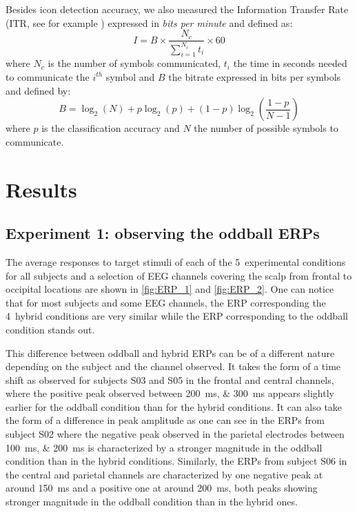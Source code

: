 \documentclass[10pt]{article}
\begin{document}
        Besides icon detection accuracy, we also measured the Information Transfer Rate (ITR, see for example \cite{Wolpaw2000, McFarland2003, Serby2005, Nijboer2010}) expressed in \emph{bits per minute} and defined as:
        \begin{equation}\label{eq:1.ITR_BCI}
        I = B \times \frac{N_c}{\sum_{i=1}^{N_c} t_i} \times 60
        \end{equation}
        where $N_c$ is the number of symbols communicated, $t_i$ the time in seconds needed to communicate the $i^{th}$ symbol and $B$ the bitrate expressed in bits per symbols and defined by:
        \begin{equation}\label{eq:2.BR_BCI}
        B = \log_2(N) + p\log_2(p) + (1-p)\log_2(\frac{1-p}{N-1})
        \end{equation}
        where $p$ is the classification accuracy and $N$ the number of possible symbols to communicate.


\section{Results}
\label{sec:3Results}

    \subsection{Experiment 1: observing the oddball \acsp{ERP}}
    \label{sec:3.1Oddball}
    The average responses to target stimuli of each of the 5~experimental conditions for all subjects and a selection of EEG channels covering the scalp from frontal to occipital locations are shown in \autoref{fig:ERP_1} and \autoref{fig:ERP_2}.
    One can notice that for most subjects and some EEG channels, the ERP corresponding the 4~hybrid conditions are very similar while the ERP corresponding to the oddball condition stands out.

    This difference between oddball and hybrid ERPs can be of a different nature depending on the subject and the channel observed.
    It takes the form of a time shift as observed for subjects S03 and S05 in the frontal and central channels, where the positive peak observed between \SIlist{200;300}{\ms} appears slightly earlier for the oddball condition than for the hybrid conditions.
    It can also take the form of a difference in peak amplitude as one can see in the ERPs from subject S02 where the negative peak observed in the parietal electrodes between \SIlist{100;200}{\ms} is characterized by a stronger magnitude in the oddball condition than in the hybrid conditions. Similarly, the ERPs from subject S06 in the central and parietal channels are characterized by one negative peak at around \SI{150}{\ms} and a positive one at around \SI{200}{\ms}, both peaks showing stronger magnitude in the oddball condition than in the hybrid ones.
\end{document}
